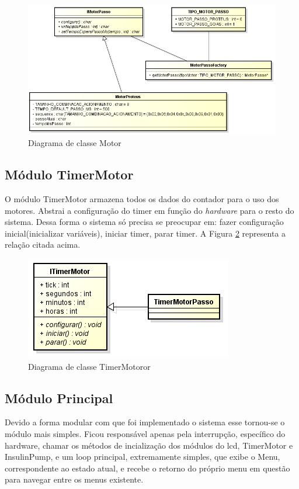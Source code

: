 \begin{figure}[htp]
	\centering
	\includegraphics[scale=1]{images/classe_motor.png}
	\caption{Diagrama de classe Motor}	
	\label{fig:classemotor}
\end{figure}

\subsection{Módulo TimerMotor}

O módulo TimerMotor armazena todos os dados do contador para o uso dos motores. Abstrai a configuração do timer em função do \emph{hardware} para o resto do sistema. Dessa forma o sistema só precisa se preocupar em: fazer configuração inicial(inicializar variáveis), iniciar timer, parar timer. A Figura \ref{fig:classe_timer_motor} representa a relação citada acima.

\begin{figure}[htp]
	\centering
	\includegraphics[scale=1]{images/classe_timer_motor.png}
	\caption{Diagrama de classe TimerMotoror}	
	\label{fig:classe_timer_motor}
\end{figure}


\subsection{Módulo Principal}

Devido a forma modular com  que foi implementado o sistema esse tornou-se o módulo mais simples. Ficou responsável apenas pela interrupção, específico do hardware, chamar os métodos de incialização dos módulos do lcd, TimerMotor e InsulinPump, e um loop principal, extremamente simples, que exibe o Menu, correspondente ao estado atual, e recebe o retorno do próprio menu em questão para navegar entre os menus existente.